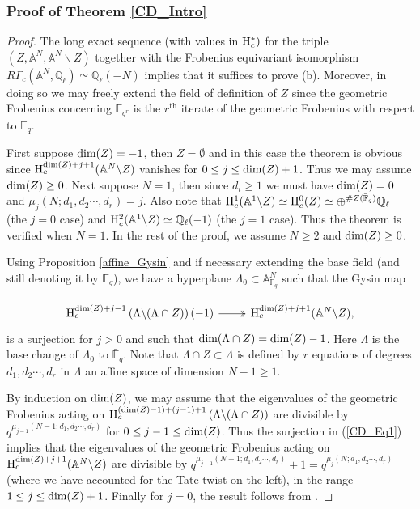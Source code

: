 \documentclass[12pt, reqno]{amsart}
\theoremstyle{plain}
\theoremstyle{definition}
\theoremstyle{definition}
\newcommand{\bbA}{{\mathbb A}}
\newcommand{\bbF}{{\mathbb F}}
\newcommand{\bbQ}{{\mathbb Q}}
\newcommand{\rH}{{\rm H}}
\begin{document}
\subsubsection{Proof of Theorem \ref{CD_Intro}}\label{CD_Proof}
\begin{proof}
The long exact sequence (with values in $\rH^*_c)$ for the triple $(Z,\bbA^N,\bbA^N \backslash Z)$ together with the Frobenius equivariant isomorphism $R\Gamma_c(\bbA^N,\bbQ_{\ell}) \simeq \bbQ_{\ell}(-N)$ implies that it suffices to prove (b). Moreover, in doing so we may freely extend the field of definition of $Z$ since the geometric Frobenius concerning $\bbF_{q^r}$ is the $r^{\mathrm{th}}$ iterate of the geometric Frobenius with respect to $\bbF_q$.

First suppose $\textup{dim}(Z)=-1$, then $Z=\emptyset$ and in this case the theorem is obvious since $\rH_c^{\textup{dim}(Z)+j+1}(\bbA^N\backslash Z)$ vanishes for $0 \leq j \leq \textup{dim}(Z)+1$. Thus we may assume $\textup{dim}(Z) \geq 0$. Next suppose $N=1$, then since $d_i \geq 1$ we must have $\textup{dim}(Z)=0$ and $\mu_j(N;d_1,d_2 \cdots,d_r)=j$. Also note that $\rH_c^{1}(\bbA^1\backslash Z) \simeq \rH_c^{0}(Z) \simeq \oplus^{\#Z(\bar{\bbF}_{q})}\bbQ_{\ell}$ (the $j=0$ case) and $\rH_c^{2}(\bbA^1\backslash Z) \simeq \bbQ_{\ell}(-1)$ (the $j=1$ case). Thus the theorem is verified when $N=1$. In the rest of the proof, we assume $N \geq 2$ and $\textup{dim}(Z) \geq 0$.

Using Proposition \ref{affine_Gysin} and if necessary extending the base field (and still denoting it by $\bbF_q$), we have a hyperplane $\Lambda_0 \subset \bbA_{\bbF_q}^N$ such that the Gysin map

\begin{equation}\label{CD_Eq1}
\begin{tikzcd}
    \rH^{\textup{dim}(Z)+j-1}_c \left (\Lambda \backslash (\Lambda \cap Z)\right )(-1) \arrow[r,two heads] & \rH_c^{\textup{dim}(Z)+j+1}(\bbA^N \backslash Z),
\end{tikzcd}
\end{equation}
\noindent is a surjection for $j>0$ and such that $\textup{dim}(\Lambda \cap Z)=\textup{dim}(Z)-1$. Here $\Lambda$ is the base change of $\Lambda_0$ to $\bar{\bbF}_q$. Note that $\Lambda \cap Z \subset \Lambda$ is defined by $r$ equations of degrees $d_1,d_2 \cdots ,d_r$ in $\Lambda$ an affine space of dimension $N-1\geq 1$.

By induction on $\textup{dim}(Z)$, we may assume that the eigenvalues of the geometric Frobenius acting on  $\rH^{(\textup{dim}(Z)-1)+(j-1)+1}_c \left (\Lambda \backslash (\Lambda \cap Z) \right )$ are divisible by $q^{\mu_{j-1}(N-1;d_1,d_2 \cdots,d_r)}$ for $0 \leq j-1 \leq \textup{dim}(Z)$. Thus the surjection in (\ref{CD_Eq1}) implies that the eigenvalues of the geometric Frobenius acting on $\rH_c^{\textup{dim}(Z)+j+1}(\bbA^N \backslash Z)$ are divisible by $q^{\mu_{j-1}(N-1;d_1,d_2 \cdots,d_r)}+1=q^{\mu_j(N;d_1,d_2 \cdots,d_r)}$ (where we have accounted for the Tate twist on the left), in the range $1 \leq j \leq \textup{dim}(Z)+1$. Finally for $j=0$, the result follows from \cite[Theorem 2.3, (1)]{EK05}.
\end{proof}
\end{document}
